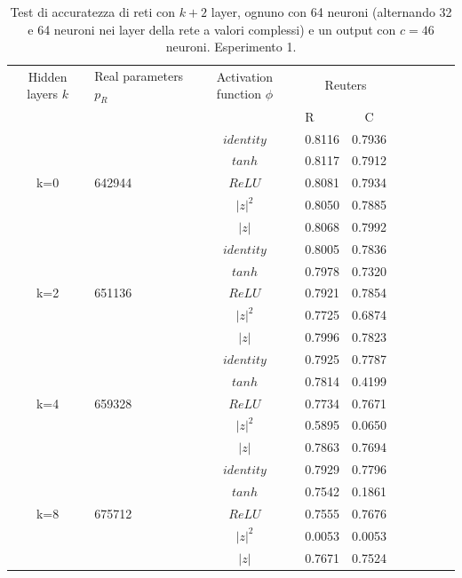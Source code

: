 \documentclass[a4paper,10pt]{article}
\begin{document}
 \begin{table}
  \centering
  \begin{tabular}{cp{} cp{}   cp{} cp{} cp{}}
   \cline{1-5}
   Hidden layers $k$ & Real parameters $p_R$ & Activation function $\phi$ & \multicolumn{2}{c}{Reuters}\\
   \cline{4-5}
   & & & R & C \\
   \cline{1-5}
   & & $identity$ & 0.8116 & 0.7936 \\
   \cline{3-5}
   & & $tanh$ & 0.8117 & 0.7912 \\
   \cline{3-5}
   k=0 & 642944 & $ReLU$ & 0.8081 & 0.7934 \\
   \cline{3-5}
   & & $|z|^2$ & 0.8050 & 0.7885 \\
   \cline{3-5}
   & & $|z|$ & 0.8068 & 0.7992 \\
   \cline{1-5}
  
   & & $identity$ & 0.8005 & 0.7836 \\
   \cline{3-5}
   & & $tanh$ & 0.7978 & 0.7320 \\
   \cline{3-5}
   k=2 & 651136 & $ReLU$ & 0.7921 & 0.7854 \\
   \cline{3-5}
   & & $|z|^2$ & 0.7725 & 0.6874 \\
   \cline{3-5}
   & & $|z|$ & 0.7996 & 0.7823 \\
   \cline{1-5}
  
   & & $identity$ & 0.7925 & 0.7787 \\
   \cline{3-5}
   & & $tanh$ & 0.7814 & 0.4199 \\
   \cline{3-5}
   k=4 & 659328 & $ReLU$ & 0.7734 & 0.7671 \\
   \cline{3-5}
   & & $|z|^2$ & 0.5895 & 0.0650 \\
   \cline{3-5}
   & & $|z|$ & 0.7863 & 0.7694 \\
   \cline{1-5}
   
   & & $identity$ & 0.7929 & 0.7796 \\
   \cline{3-5}
   & & $tanh$ & 0.7542 & 0.1861 \\
   \cline{3-5}
   k=8 & 675712 & $ReLU$ & 0.7555 & 0.7676 \\
   \cline{3-5}
   & & $|z|^2$ & 0.0053 & 0.0053 \\
   \cline{3-5}
   & & $|z|$ & 0.7671 & 0.7524 \\
   \cline{1-5}
  \end{tabular}
  \caption{Test di accuratezza di reti con $k+2$ layer, ognuno con 64 neuroni (alternando 32 e 64 neuroni nei layer della rete a valori complessi) e un output con $c=46$ neuroni. Esperimento 1.}
  \label{Reuters1Tab}
 \end{table}
 
\end{document}
